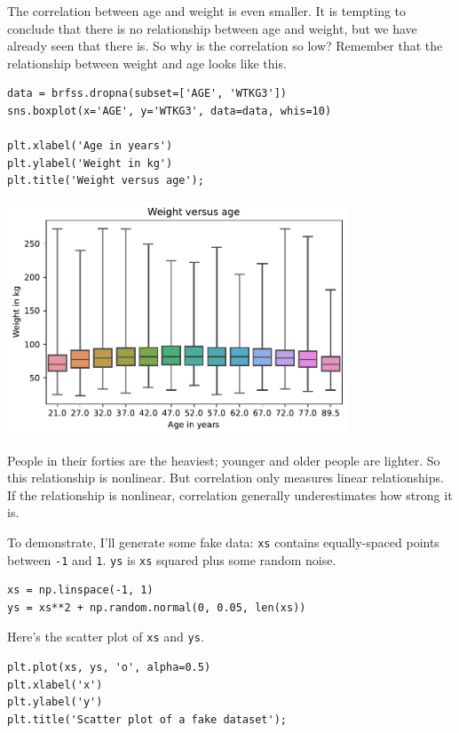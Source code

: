 The correlation between age and weight is even smaller. It is tempting
to conclude that there is no relationship between age and weight, but we
have already seen that there is. So why is the correlation so low?
Remember that the relationship between weight and age looks like this.

\begin{lstlisting}[]
data = brfss.dropna(subset=['AGE', 'WTKG3'])
sns.boxplot(x='AGE', y='WTKG3', data=data, whis=10)

plt.xlabel('Age in years')
plt.ylabel('Weight in kg')
plt.title('Weight versus age');
\end{lstlisting}

\begin{center}
\includegraphics[width=4in]{chapters/09_relationships_files/09_relationships_57_0.pdf}
\end{center}

People in their forties are the heaviest; younger and older people are
lighter. So this relationship is nonlinear. But correlation only
measures linear relationships. If the relationship is nonlinear,
correlation generally underestimates how strong it is.

To demonstrate, I'll generate some fake data:
\passthrough{\lstinline!xs!} contains equally-spaced points between
\passthrough{\lstinline!-1!} and \passthrough{\lstinline!1!}.
\passthrough{\lstinline!ys!} is \passthrough{\lstinline!xs!} squared
plus some random noise.

\begin{lstlisting}[]
xs = np.linspace(-1, 1)
ys = xs**2 + np.random.normal(0, 0.05, len(xs))
\end{lstlisting}

Here's the scatter plot of \passthrough{\lstinline!xs!} and
\passthrough{\lstinline!ys!}.

\begin{lstlisting}[]
plt.plot(xs, ys, 'o', alpha=0.5)
plt.xlabel('x')
plt.ylabel('y')
plt.title('Scatter plot of a fake dataset');
\end{lstlisting}

